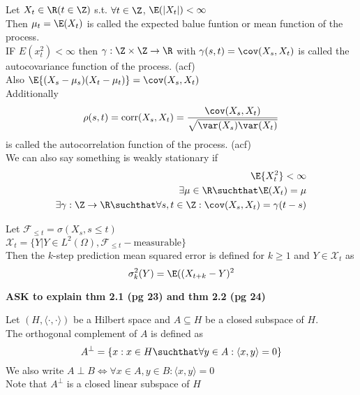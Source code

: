 \documentclass[answers,12pt,addpoints]{exam}
\begin{document}
\begin{definition}
    Let $X_t \in \R (t \in \Z)$ s.t. $\forall t \in \Z$, $\E(|X_t|) < \infty$ \\
    Then $\mu_t = \E(X_t)$ is called the expected balue funtion or mean function of the process.\\
    IF $E(x_t^2) < \infty$ then $\gamma: \Z \times \Z \to \R$ with $\gamma(s,t) = \cov(X_s, X_t)$ is called the autocovariance function of the process. (acf)\\
    Also $\E{(X_s - \mu_s)(X_t - \mu_t)} = \cov(X_s, X_t)$\\
    Additionally 
    $$ \rho(s,t) = \text{corr}(X_s, X_t) = \frac{\cov(X_s, X_t)}{\sqrt{\var(X_s) \var(X_t)}}$$
    is called the autocorrelation function of the process. (acf)\\
    We can also say something is weakly stationary if\\
    \begin{align*}
        \E{X_t^2} < \infty \\
        \exists \mu \in \R \suchthat \E(X_t) = \mu \\
        \exists \gamma: \Z \to \R \suchthat \forall s,t \in \Z: \cov(X_s, X_t) = \gamma(t-s)
    \end{align*}
\end{definition}
\begin{definition}
    Let $\mathscr{F}_{\leq t} = \sigma(X_s, s \leq t)$ \\
    $\mathscr{X}_t = \{Y | Y \in L^2(\Omega), \mathscr{F}_{\leq t}-\text{measurable}\}$\\
    Then the $k$-step prediction mean squared error is defined for $k \geq 1$ and $Y \in \mathscr{X}_t$ as\\
    $$\sigma_k^2(Y) = \E((X_{t+k} - Y)^2 $$ 
    
\end{definition}
\textbf{ASK to explain thm 2.1 (pg 23) and thm 2.2 (pg 24)}\\
\begin{definition}
    Let $(H,\langle \cdot, \cdot \rangle)$ be a Hilbert space and $A \subseteq H$ be a closed subspace of $H$.\\
    The orthogonal complement of $A$ is defined as
    $$A^{\perp} = \{x: x\in H \suchthat \forall y \in A: \langle x,y \rangle = 0\}$$
    We also write $A \perp B \iff \forall x \in A, y \in B: \langle x,y \rangle = 0$\\
    Note that $A^{\perp}$ is a closed linear subspace of $H$ 
\end{definition}
\end{document}
